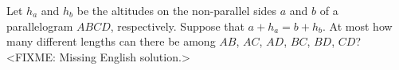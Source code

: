 \problem
Let $h_a$ and $h_b$ be the altitudes on the non-parallel sides $a$ and $b$ of a
parallelogram $ABCD$, respectively.
Suppose that $a + h_a = b + h_b$.
At most how many different lengths can there be among
$AB$, $AC$, $AD$, $BC$, $BD$, $CD$?
\solution
<FIXME: Missing English solution.>
\endproblem
